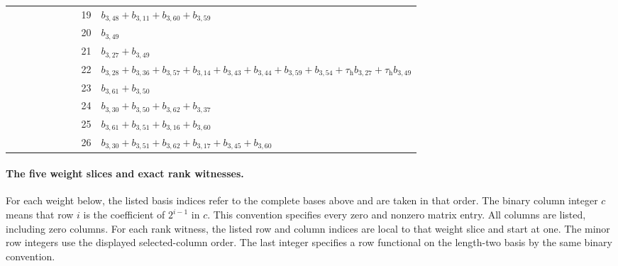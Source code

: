 \begin{longtable}{r p{0.78\linewidth}}
19 & $b_{3,48} + b_{3,11} + b_{3,60} + b_{3,59}$\\
20 & $b_{3,49}$\\
21 & $b_{3,27} + b_{3,49}$\\
22 & $b_{3,28} + b_{3,36} + b_{3,57} + b_{3,14} + b_{3,43} + b_{3,44} + b_{3,59} + b_{3,54} + \tau_{\mathrm h}b_{3,27} + \tau_{\mathrm h}b_{3,49}$\\
23 & $b_{3,61} + b_{3,50}$\\
24 & $b_{3,30} + b_{3,50} + b_{3,62} + b_{3,37}$\\
25 & $b_{3,61} + b_{3,51} + b_{3,16} + b_{3,60}$\\
26 & $b_{3,30} + b_{3,51} + b_{3,62} + b_{3,17} + b_{3,45} + b_{3,60}$\\
\end{longtable}
\paragraph{The five weight slices and exact rank witnesses.}
For each weight below, the listed basis indices refer to the complete
bases above and are taken in that order. The binary column integer
$c$ means that row $i$ is the coefficient of $2^{i-1}$ in $c$.
This convention specifies every zero and nonzero matrix entry.
All columns are listed, including zero columns. For each rank witness,
the listed row and column indices are local to that weight slice and
start at one. The minor row integers use the displayed selected-column
order. The last integer specifies a row functional on the length-two
basis by the same binary convention.


